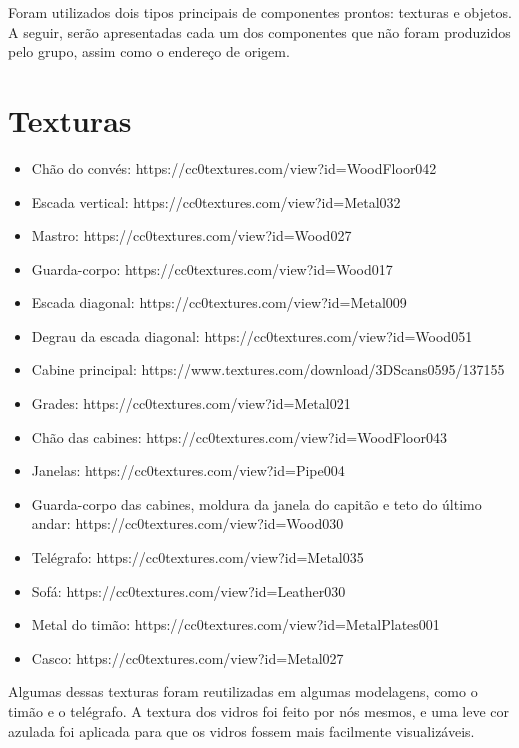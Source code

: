 Foram utilizados dois tipos principais de componentes prontos: texturas e objetos. A seguir, serão apresentadas cada um dos componentes que não foram produzidos pelo grupo, assim como o endereço de origem.

\section{Texturas}

\begin{itemize}
    \item Chão do convés: https://cc0textures.com/view?id=WoodFloor042
    \item Escada vertical: https://cc0textures.com/view?id=Metal032
    \item Mastro: https://cc0textures.com/view?id=Wood027
    \item Guarda-corpo: https://cc0textures.com/view?id=Wood017
    \item Escada diagonal: https://cc0textures.com/view?id=Metal009
    \item Degrau da escada diagonal: https://cc0textures.com/view?id=Wood051
    \item Cabine principal: https://www.textures.com/download/3DScans0595/137155
    \item Grades: https://cc0textures.com/view?id=Metal021
    \item Chão das cabines: https://cc0textures.com/view?id=WoodFloor043
    \item Janelas: https://cc0textures.com/view?id=Pipe004
    \item Guarda-corpo das cabines, moldura da janela do capitão e teto do último andar: https://cc0textures.com/view?id=Wood030
    \item Telégrafo: https://cc0textures.com/view?id=Metal035
    \item Sofá: https://cc0textures.com/view?id=Leather030
    \item Metal do timão: https://cc0textures.com/view?id=MetalPlates001
    \item Casco: https://cc0textures.com/view?id=Metal027
    
\end{itemize}

Algumas dessas texturas foram reutilizadas em algumas modelagens, como o timão e o telégrafo. A textura dos vidros foi feito por nós mesmos, e uma leve cor azulada foi aplicada para que os vidros fossem mais facilmente visualizáveis.

